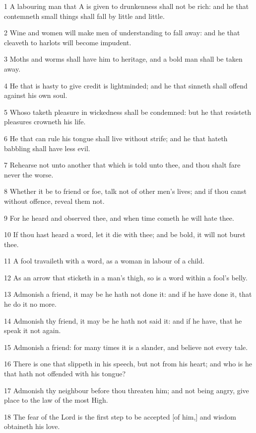 \par 1 A labouring man that A is given to drunkenness shall not be rich: and he that contemneth small things shall fall by little and little.
\par 2 Wine and women will make men of understanding to fall away: and he that cleaveth to harlots will become impudent.
\par 3 Moths and worms shall have him to heritage, and a bold man shall be taken away.
\par 4 He that is hasty to give credit is lightminded; and he that sinneth shall offend against his own soul.
\par 5 Whoso taketh pleasure in wickedness shall be condemned: but he that resisteth pleasures crowneth his life.
\par 6 He that can rule his tongue shall live without strife; and he that hateth babbling shall have less evil.
\par 7 Rehearse not unto another that which is told unto thee, and thou shalt fare never the worse.
\par 8 Whether it be to friend or foe, talk not of other men's lives; and if thou canst without offence, reveal them not.
\par 9 For he heard and observed thee, and when time cometh he will hate thee.
\par 10 If thou hast heard a word, let it die with thee; and be bold, it will not burst thee.
\par 11 A fool travaileth with a word, as a woman in labour of a child.
\par 12 As an arrow that sticketh in a man's thigh, so is a word within a fool's belly.
\par 13 Admonish a friend, it may be he hath not done it: and if he have done it, that he do it no more.
\par 14 Admonish thy friend, it may be he hath not said it: and if he have, that he speak it not again.
\par 15 Admonish a friend: for many times it is a slander, and believe not every tale.
\par 16 There is one that slippeth in his speech, but not from his heart; and who is he that hath not offended with his tongue?
\par 17 Admonish thy neighbour before thou threaten him; and not being angry, give place to the law of the most High.
\par 18 The fear of the Lord is the first step to be accepted [of him,] and wisdom obtaineth his love.
